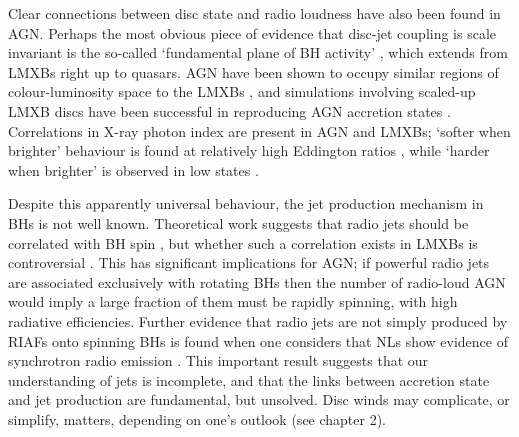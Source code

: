 Clear connections between disc state and radio loudness have also been
found in AGN. Perhaps the most obvious piece of evidence that disc-jet coupling
is scale invariant is the so-called `fundamental plane of BH activity' 
\citep{merloni2003}, which extends from LMXBs right up to quasars. 
AGN have been shown to occupy similar regions of colour-luminosity
space to the LMXBs \citep{kording2006}, and simulations involving
scaled-up LMXB discs have been successful in reproducing AGN accretion states
\citep{sobolewska2011}. Correlations
in X-ray photon index are present in AGN and LMXBs;
`softer when brighter' behaviour is found 
at relatively high Eddington ratios \citep{mchardy1999,gu2009},
while `harder when brighter' is observed in 
low states \citep{gu2009,dimitri_llagn,connolly2016}.

Despite this apparently universal behaviour, 
the jet production mechanism in BHs is not well known. 
Theoretical work suggests that radio jets should be correlated with BH spin 
\citep{penrose1971,blandford1977}, 
but whether such a correlation exists in LMXBs is 
controversial \citep{fender2010,narayan2012}.
This has significant implications for AGN; if powerful radio jets are 
associated exclusively with rotating BHs then the number of radio-loud AGN
would imply a large fraction of them must be rapidly spinning, with
high radiative efficiencies. 
Further evidence that radio jets are not simply produced by RIAFs onto spinning
BHs is found when one considers that NLs show evidence of synchrotron
radio emission \citep{coppejans2015}. This important result suggests that our understanding
of jets is incomplete, and that the links between accretion state and 
jet production are fundamental, but unsolved. Disc winds may complicate, or simplify,
matters, depending on one's outlook (see chapter 2).

